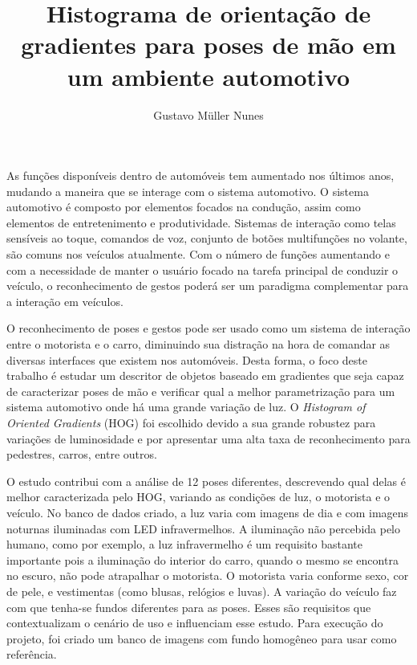 \documentclass[rascunho]{fei}
\author{Gustavo Müller Nunes}
\title{Histograma de orientação de gradientes para poses de mão em um ambiente automotivo}
\begin{document}
	\maketitle
	
	
	
	
	
	
\begin{resumo}
\cite{kim2007tensor} \cite{triesch2001system} As funções disponíveis dentro de automóveis tem aumentado nos últimos anos, mudando a maneira que se interage com o sistema automotivo. O sistema automotivo é composto por elementos focados na condução, assim como elementos de entretenimento e produtividade. Sistemas de interação como telas sensíveis ao toque, comandos de voz, conjunto de botões multifunções no volante, são comuns nos veículos atualmente. Com o número de funções aumentando e com a necessidade de manter o usuário focado na tarefa principal de conduzir o veículo, o reconhecimento de gestos poderá ser um paradigma complementar para a interação em veículos. 

 O reconhecimento de poses e gestos pode ser usado como um sistema de interação entre o motorista e o carro, diminuindo sua distração na hora de comandar as diversas interfaces que existem nos automóveis. Desta forma, o foco deste trabalho é estudar um descritor de objetos baseado em gradientes que seja capaz de caracterizar poses de mão e verificar qual a melhor parametrização para um sistema automotivo onde há uma grande variação de luz. O \textit{Histogram of Oriented Gradients} (HOG) foi escolhido devido a sua grande robustez para variações de luminosidade e por apresentar uma alta taxa de reconhecimento para pedestres, carros, entre outros.

O estudo contribui com a análise de 12 poses diferentes, descrevendo qual delas é melhor caracterizada pelo HOG, variando as condições de luz, o motorista e o veículo. No banco de dados criado, a luz varia com imagens de dia e com imagens noturnas iluminadas com LED infravermelhos. A iluminação não percebida pelo humano, como por exemplo, a luz infravermelho é um requisito bastante importante pois a iluminação do interior do carro, quando o mesmo se encontra no escuro, não pode atrapalhar o motorista. O motorista varia conforme sexo, cor de pele, e vestimentas (como blusas, relógios e luvas). A variação do veículo faz com que tenha-se fundos diferentes para as poses. Esses são requisitos que contextualizam o cenário de uso e influenciam esse estudo. Para execução do projeto, foi criado um banco de imagens com fundo homogêneo para usar como referência.


\end{resumo}
\end{document}
